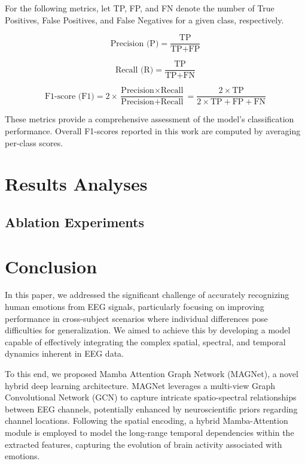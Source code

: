 \documentclass[runningheads]{llncs}
\begin{document}
For the following metrics, let TP, FP, and FN denote the number of True Positives, False Positives, and False Negatives for a given class, respectively.

\begin{equation}
\text{Precision (P)} = \frac{\text{TP}}{\text{TP} + \text{FP}}
\end{equation}

\begin{equation}
\text{Recall (R)} = \frac{\text{TP}}{\text{TP} + \text{FN}}
\end{equation}

\begin{equation}
\label{eq:f1_score} %
\text{F1-score (F1)} = 2 \times \frac{\text{Precision} \times \text{Recall}}{\text{Precision} + \text{Recall}} = \frac{2 \times \text{TP}}{2 \times \text{TP} + \text{FP} + \text{FN}}
\end{equation}

These metrics provide a comprehensive assessment of the model's classification performance. Overall F1-scores reported in this work are computed by averaging per-class scores. %

\section{Results Analyses}






\subsection{Ablation Experiments}


\section{Conclusion}
\label{sec:conclusion}

In this paper, we addressed the significant challenge of accurately recognizing human emotions from EEG signals, particularly focusing on improving performance in cross-subject scenarios where individual differences pose difficulties for generalization. We aimed to achieve this by developing a model capable of effectively integrating the complex spatial, spectral, and temporal dynamics inherent in EEG data.

To this end, we proposed Mamba Attention Graph Network (MAGNet), a novel hybrid deep learning architecture. MAGNet leverages a multi-view Graph Convolutional Network (GCN) to capture intricate spatio-spectral relationships between EEG channels, potentially enhanced by neuroscientific priors regarding channel locations. Following the spatial encoding, a hybrid Mamba-Attention module is employed to model the long-range temporal dependencies within the extracted features, capturing the evolution of brain activity associated with emotions.
\end{document}
